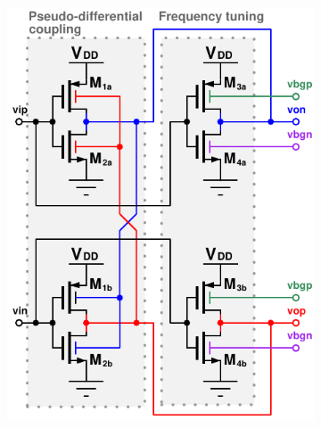 			\begin{figure}[htb!]
			    \centering
			    \begin{subfigure}{0.5\textwidth}
			        \centering
			        \includegraphics[width=1\textwidth, angle=0]{./figs/design/parallel_delay_cell2}
			        \caption{ }
			        \label{fig:parallel_delay_cell}
			    \end{subfigure}%
			    \begin{subfigure}{0.5\textwidth}
			        \centering

\end{subfigure}
\end{figure}
